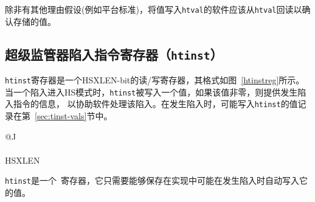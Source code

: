 \begin{commentary}
  除非有其他理由假设(例如平台标准)，将值写入{\tt htval}的软件应该从{\tt htval}回读以确认存储的值。
\end{commentary}

\subsection{超级监管器陷入指令寄存器（{\tt htinst}）}

{\tt htinst}寄存器是一个HSXLEN-bit的读/写寄存器，其格式如图~\ref{htinstreg}所示。
当一个陷入进入HS模式时，{\tt htinst}被写入一个值，如果该值非零，则提供发生陷入指令的信息，
以协助软件处理该陷入。在发生陷入时，可能写入{\tt htinst}的值记录在第~\ref{sec:tinst-vals}节中。

\begin{figure*}[h!]
{\footnotesize
\begin{center}
\begin{tabular}{@{}J}
 \\
\hline
{} \\
\hline
HSXLEN \\
\end{tabular}
\end{center}
}
\vspace{-0.1in}
\caption{超级监管器陷入指令寄存器（{\tt htinst}）。
 }
\label{htinstreg}
\end{figure*}

{\tt htinst}是一个\warl\ 寄存器，它只需要能够保存在实现中可能在发生陷入时自动写入它的值。

